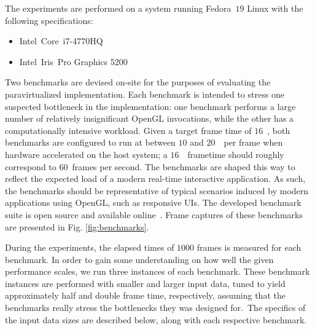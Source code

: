 The experiments are performed on a system running Fedora~$19$ Linux with the following specifications:
\begin{itemize}
\item Intel\circledR\ Core\texttrademark\ i7-4770HQ
\item Intel\circledR\ Iris\texttrademark\ Pro Graphics 5200
\end{itemize}

Two benchmarks are devised on-site for the purposes of evaluating the paravirtualized implementation.
Each benchmark is intended to stress one suspected bottleneck in the implementation: one benchmark performs a large number of relatively insignificant OpenGL invocations, while the other has a computationally intensive workload.
Given a target frame time of $16$~\milli\second , both benchmarks are configured to run at between $10$ and $20$~\milli\second\ per frame when hardware accelerated on the host system; a $16$~\milli\second\ frametime should roughly correspond to $60$~frames per second.
The benchmarks are shaped this way to reflect the expected load of a modern real-time interactive application.
As such, the benchmarks should be representative of typical scenarios induced by modern applications using OpenGL, such as responsive UIs.
The developed benchmark suite is open source and available online~.
Frame captures of these benchmarks are presented in Fig. \ref{fig:benchmarks}.

During the experiments, the elapsed times of $1000$ frames is measured for each benchmark.
In order to gain some understanding on how well the given performance scales, we run three instances of each benchmark.
These benchmark instances are performed with smaller and larger input data, tuned to yield approximately half and double frame time, respectively, assuming that the benchmarks really stress the bottlenecks they was designed for.\
The specifics of the input data sizes are described below, along with each respective benchmark.

